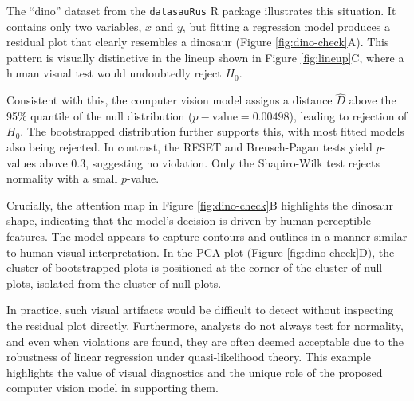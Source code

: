 \documentclass[]{interact}
\theoremstyle{plain}%
\theoremstyle{definition}
\theoremstyle{remark}
\begin{document}
The ``dino'' dataset from the \texttt{datasauRus} R package illustrates
this situation. It contains only two variables, \(x\) and \(y\), but
fitting a regression model produces a residual plot that clearly
resembles a dinosaur (Figure \ref{fig:dino-check}A). This pattern is
visually distinctive in the lineup shown in Figure \ref{fig:lineup}C,
where a human visual test would undoubtedly reject \(H_0\).

Consistent with this, the computer vision model assigns a distance
\(\hat{D}\) above the 95\% quantile of the null distribution
(\(p-\text{value} = 0.00498\)), leading to rejection of \(H_0\). The
bootstrapped distribution further supports this, with most fitted models
also being rejected. In contrast, the RESET and Breusch-Pagan tests
yield \(p\)-values above \(0.3\), suggesting no violation. Only the
Shapiro-Wilk test rejects normality with a small \(p\)-value.

Crucially, the attention map in Figure \ref{fig:dino-check}B highlights
the dinosaur shape, indicating that the model's decision is driven by
human-perceptible features. The model appears to capture contours and
outlines in a manner similar to human visual interpretation. In the PCA
plot (Figure \ref{fig:dino-check}D), the cluster of bootstrapped plots
is positioned at the corner of the cluster of null plots, isolated from
the cluster of null plots.

In practice, such visual artifacts would be difficult to detect without
inspecting the residual plot directly. Furthermore, analysts do not
always test for normality, and even when violations are found, they are
often deemed acceptable due to the robustness of linear regression under
quasi-likelihood theory. This example highlights the value of visual
diagnostics and the unique role of the proposed computer vision model in
supporting them.
\end{document}
